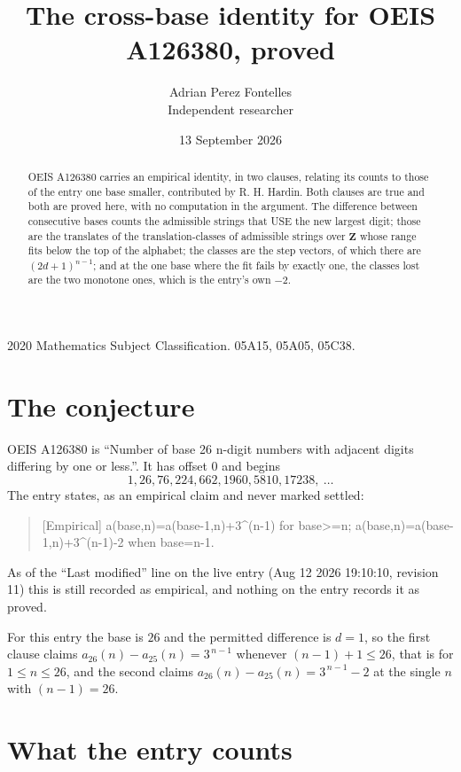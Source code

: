 \documentclass[11pt,a4paper]{article}
\title{The cross-base identity for OEIS A126380, proved}
\author{Adrian Perez Fontelles\\ \small Independent researcher}
\date{13 September 2026}
\theoremstyle{plain}
\theoremstyle{definition}
\begin{document}
\maketitle

\begin{abstract}
OEIS A126380 carries an empirical identity, in two clauses, relating its counts to those of the
entry one base smaller, contributed by R. H. Hardin. Both clauses are true and both are proved
here, with no computation in the argument. The difference between consecutive bases counts the
admissible strings that USE the new largest digit; those are the translates of the
translation-classes of admissible strings over $\mathbf{Z}$ whose range fits below the top of
the alphabet; the classes are the step vectors, of which there are $(2d+1)^{n-1}$; and at the
one base where the fit fails by exactly one, the classes lost are the two monotone ones, which
is the entry's own $-2$.
\end{abstract}

\noindent\small 2020 Mathematics Subject Classification. 05A15, 05A05, 05C38.\normalsize

\section{The conjecture}

OEIS A126380 is ``Number of base 26 n-digit numbers with adjacent digits differing by one or less.''. It has offset $0$ and begins
\[
1, 26, 76, 224, 662, 1960, 5810, 17238,\ \dots
\]
The entry states, as an empirical claim and never marked settled:
\begin{quote}
[Empirical] a(base,n)=a(base-1,n)+3\textasciicircum{}(n-1) for base>=n; a(base,n)=a(base-1,n)+3\textasciicircum{}(n-1)-2 when base=n-1.
\end{quote}
As of the ``Last modified'' line on the live entry (Aug 12 2026 19:10:10, revision 11)
this is still recorded as empirical, and nothing on the entry records it as proved.

For this entry the base is $26$ and the permitted difference is $d=1$, so the first clause
claims $a_{26}(n)-a_{25}(n)=3^{\,n-1}$ whenever $(n-1)+1\le26$, that is for
$1\le n\le26$, and the second claims $a_{26}(n)-a_{25}(n)=3^{\,n-1}-2$ at the single
$n$ with $(n-1)=26$.

\section{What the entry counts}
\end{document}
